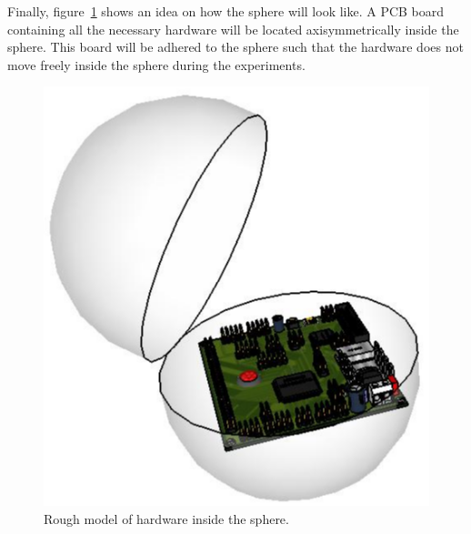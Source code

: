 Finally, figure~\ref{fig:sphere} shows an idea on how the sphere will look like.  A PCB board containing all the necessary hardware will be located axisymmetrically inside the sphere.  This board will be adhered to the sphere such that the hardware does not move freely inside the sphere during the experiments.

\begin{figure}[H]
	\centering
	\includegraphics[scale=0.6]{img/Sphere_001}
	\caption{Rough model of hardware inside the sphere. \label{fig:sphere}}
\end{figure}